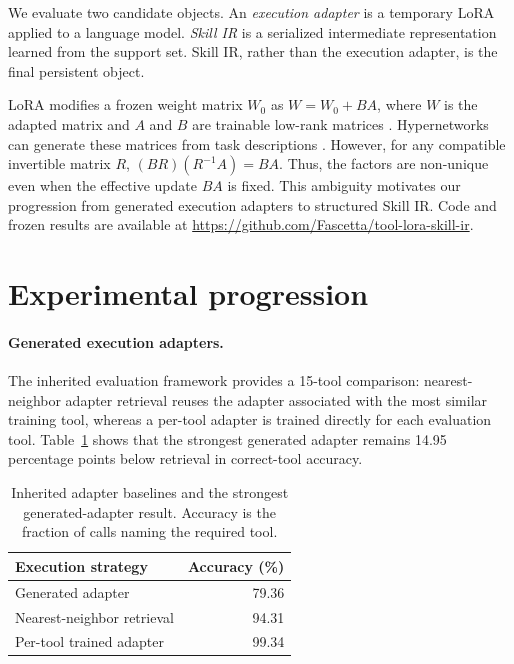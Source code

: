 \documentclass{article}
\begin{document}
We evaluate two candidate objects. An \emph{execution adapter} is a temporary LoRA applied to a language model. \emph{Skill IR} is a serialized intermediate representation learned from the support set. Skill IR, rather than the execution adapter, is the final persistent object.

LoRA modifies a frozen weight matrix $W_0$ as $W=W_0+BA$, where $W$ is the adapted matrix and $A$ and $B$ are trainable low-rank matrices \cite{hu2022lora}. Hypernetworks can generate these matrices from task descriptions \cite{charakorn2025text}. However, for any compatible invertible matrix $R$, $(BR)(R^{-1}A)=BA$. Thus, the factors are non-unique even when the effective update $BA$ is fixed. This ambiguity motivates our progression from generated execution adapters to structured Skill IR. Code and frozen results are available at \url{https://github.com/Fascetta/tool-lora-skill-ir}.

\section{Experimental progression}

\paragraph{Generated execution adapters.}
The inherited evaluation framework provides a 15-tool comparison: nearest-neighbor adapter retrieval reuses the adapter associated with the most similar training tool, whereas a per-tool adapter is trained directly for each evaluation tool. Table~\ref{tab:adapter} shows that the strongest generated adapter remains 14.95 percentage points below retrieval in correct-tool accuracy.

\begin{table}[t]
\caption{Inherited adapter baselines and the strongest generated-adapter result. Accuracy is the fraction of calls naming the required tool.}
\label{tab:adapter}
\centering
\small
\begin{tabular}{lr}
\toprule
Execution strategy & Accuracy (\%) \\
\midrule
Generated adapter & 79.36 \\
Nearest-neighbor retrieval & 94.31 \\
Per-tool trained adapter & 99.34 \\
\bottomrule
\end{tabular}
\end{table}
\end{document}
